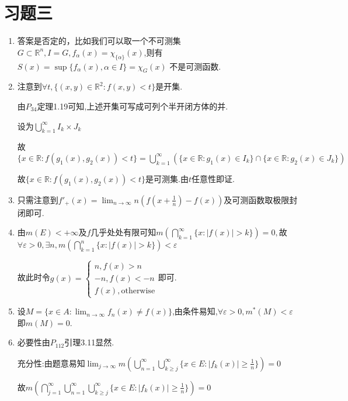 \documentclass[UTF8, a4paper, 12pt, oneside, onecolumn]{article}
\numberwithin{equation}{section}
\numberwithin{figure}{section}
\numberwithin{table}{section}
\def\-{\textrm{-}}	%
\theoremstyle{nonumberplain}	%
\theoremstyle{plain}	%
\theoremstyle{plain}	%
\theoremstyle{plain}	%
\theoremstyle{plain}	%
\theoremstyle{nonumberplain}
\begin{document}
\newpage



\part{习题三}

\begin{enumerate}
	\item 答案是否定的，比如我们可以取一个不可测集$G\subset \mathbb{R}^n,I=G,f_\alpha(x)=\chi_{\{\alpha\}}(x)$,则有$S(x)=\sup\{f_\alpha(x),\alpha\in I\}=\chi_{G}(x)$
	不是可测函数.
	\item 注意到$\forall t,\{(x,y)\in\mathbb{R}^2:f(x,y)<t\}$是开集.
	
	由$P_{34}$定理1.19可知,上述开集可写成可列个半开闭方体的并.
	
	设为$\displaystyle\bigcup_{k=1}^{\infty}I_k\times J_k $
	
	故$\displaystyle\{x\in\mathbb{R}:f(g_1(x),g_2(x))<t\}=\bigcup_{k = 1}^{\infty}(\{x\in\mathbb{R}:g_1(x)\in I_k\}\cap\{x\in\mathbb{R}:g_2(x)\in J_k\}) $
	
	故$\displaystyle\{x\in\mathbb{R}:f(g_1(x),g_2(x))<t\}$是可测集.由$t$任意性即证.
	
	\item 只需注意到$\displaystyle f'_+(x)=\lim_{n\rightarrow \infty}n(f(x+\frac{1}{n})-f(x))$及可测函数取极限封闭即可.
	
	\item 由$m(E)<+\infty$及$f$几乎处处有限可知$\displaystyle m(\bigcap_{k=1}^{\infty}\{x:|f(x)|>k\})=0,$故$\displaystyle\forall \varepsilon>0,\exists n,m(\bigcap_{k=1}^{n}\{x:|f(x)|>k\})<\varepsilon$
	
	故此时令$g(x)=\left\{\begin{array}{c}n,f(x)>n\\-n,f(x)<-n\\f(x),\text{otherwise}\end{array}\right.$即可.
	
	\item 设$\displaystyle M=\{x\in A:\lim_{n\rightarrow \infty}f_n(x)\neq f(x)\} $,由条件易知,$\forall \varepsilon >0,m^*(M)<\varepsilon$即$m(M)=0$.
	
	\item
	必要性由$P_{112}$引理3.11显然.
	
	充分性:由题意易知$\displaystyle\lim_{j\rightarrow\infty}m(\bigcup_{n=1}^{\infty}\bigcup_{k\geqslant j}^{\infty}\{x\in E:|f_k(x)|\geqslant\frac{1}{n} \})=0 $
	
	故$\displaystyle m(\bigcap_{j=1}^{\infty}\bigcup_{n=1}^{\infty}\bigcup_{k\geqslant j}^{\infty}\{x\in E:|f_k(x)|\geqslant\frac{1}{n} \})=0 $
	

\end{enumerate}
\end{document}
